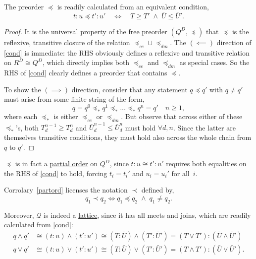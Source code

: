 \documentclass{article}
\newcommand{\Q}{\ensuremath{\mathcal{Q}}}
\begin{document}
\begin{fact}
  The preorder $\preceq$ is readily calculated from an equivalent condition,
  \begin{equation}
  t\!:\!u \preceq t'\!:\!u' \quad\iff\quad T \ge T' \;\wedge\; \bar{U} \le \bar{U}'.\label{cond}
  \end{equation}
\end{fact}
\begin{proof}
  It is the universal property of the free preorder $(Q^D, \preceq)$ that $\preceq$ is the reflexive, transitive closure of the relation $\preceq_{ce} \cup \preceq_{dm}$.  The $(\!\impliedby\!)$ direction of \eqref{cond} is immediate: the RHS obviously defines a reflexive and transitive relation on $R^D \cong Q^D$, which directly implies both $\preceq_{ce}$ and $\preceq_{dm}$ as special cases.  So the RHS of \eqref{cond} clearly defines a preorder that contains $\preceq$.

  To show the $(\!\implies\!)$ direction, consider that any statement $q \preceq q'$ with $q \neq q'$ must arise from some finite string of the form,
  \begin{equation}
  q = q^0 \preceq_* q^1 \preceq_* ... \preceq_* q^n = q' \quad n \ge 1, \label{string}
  \end{equation}
  where each $\preceq_*$ is either $\preceq_{ce}$ or $\preceq_{dm}$.  But observe that across either of these $\preceq_*$'s, both $T_d^{n-1} \ge T_d^n$ and $\bar{U}_d^{n-1} \le \bar{U}_d^n$ must hold $\forall d, n$.  Since the latter are themselves transitive conditions, they must hold also across the whole chain from $q$ to $q'$.  
\end{proof}

\begin{corr}\label{partord}
  $\preceq$ is in fact a \underline{partial order} on $Q^D$, since $t\!:\!u \cong t'\!:\!u'$ requires both equalities on the RHS of \eqref{cond} to hold, forcing $t_i = t_i'$ and $u_i = u_i'$ for all $\,i$.
\end{corr}

\begin{nota}
  Corrolary~\ref{partord} licenses the notation $\prec$ defined by,
  $$
  q_1 \prec q_2 \iff q_1 \preceq q_2 \;\wedge\; q_1 \neq q_2.
  $$
\end{nota}

\begin{corr}\label{lattice}
  Moreover, $\Q$ is indeed a \underline{lattice}, since it has all meets and joins, which are readily calculated from \eqref{cond}:
  \begin{equation}\label{meetjoin}
    \begin{aligned}
    q \wedge q' & \cong (t\!:\!u) \wedge (t'\!:\!u') \cong
    (T\!:\!\bar{U}) \wedge (T'\!:\!\bar{U}') = (T\!\vee\!T'):(\bar{U}\!\wedge\!\bar{U}')
    \\
    q \vee q' & \cong (t\!:\!u) \vee (t'\!:\!u') \cong
    (T\!:\!\bar{U}) \vee (T'\!:\!\bar{U}') = (T\!\wedge\!T'):(\bar{U}\!\vee\!\bar{U}').
    \end{aligned}
  \end{equation}
\end{corr}
\end{document}
